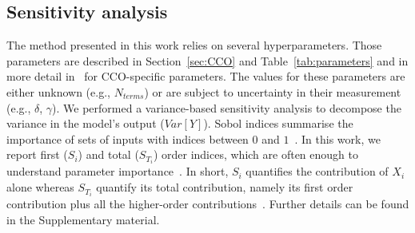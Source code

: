 \documentclass[11pt,]{article}
\let\oldequation\equation
\let\oldendequation\endequation
\renewenvironment{equation}
  {\linenomathNonumbers\oldequation}
  {\oldendequation\endlinenomath}
\begin{document}
\subsection{Sensitivity analysis}\label{sec:method-gsa}

The method presented in this work relies on several hyperparameters.
Those parameters are described in Section~\ref{sec:CCO} and Table~\ref{tab:parameters} and in more detail in~\cite{Talou2021} for CCO-specific parameters.
The values for these parameters are either unknown (e.g., $N_{terms}$) or are subject to uncertainty in their measurement (e.g., $\delta$, $\gamma$).
We performed a variance-based sensitivity analysis to decompose the variance in the model's output ($Var[Y]$).
Sobol indices summarise the importance of sets of inputs with indices between $0$ and $1$~\cite{Saltelli2008}.
In this work, we report first ($S_i$) and total ($S_{T_i}$) order indices, which are often enough to understand parameter importance~\cite{Saltelli2008}.
In short, $S_i$ quantifies the contribution of $X_i$ alone whereas $S_{T_i}$ quantify its total contribution, namely its first order contribution plus all the higher-order contributions~\cite{Saltelli2008}.
Further details can be found in the Supplementary material.
\end{document}
